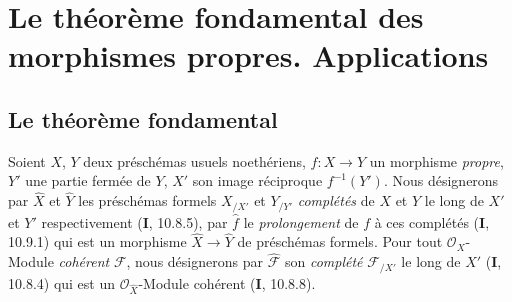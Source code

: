 \section{Le théorème fondamental des morphismes propres. Applications}
\label{section:III.4-fr}

\subsection{Le théorème fondamental}
\label{subsection:III.4.1-fr}

\begin{env}[4.1.1]
\label{III.4.1.1-fr}
Soient $X$, $Y$ deux préschémas usuels noethériens, $f:X\to Y$ un
morphisme \emph{propre}, $Y'$ une partie fermée de $Y$, $X'$ son image réciproque
$f^{-1}(Y')$. Nous désignerons par $\widehat X$ et $\widehat Y$ les
préschémas formels $X_{/X'}$ et $Y_{/Y'}$ \emph{complétés} de $X$ et $Y$ le long
de $X'$ et $Y'$ respectivement (\textbf{I}, 10.8.5), par $\widehat f$ le \emph{prolongement}
de $f$ à ces complétés (\textbf{I}, 10.9.1) qui est un morphisme
$\widehat X\to\widehat Y$ de préschémas formels. Pour tout
$\mathcal O_X$-Module \emph{cohérent} $\mathcal F$, nous
désignerons par $\widehat{\mathcal F}$ son \emph{complété} $\mathcal F_{/X'}$ le
long de $X'$ (\textbf{I}, 10.8.4) qui est un $\mathcal O_{\widehat X}$-Module
cohérent (\textbf{I}, 10.8.8).
\end{env}

